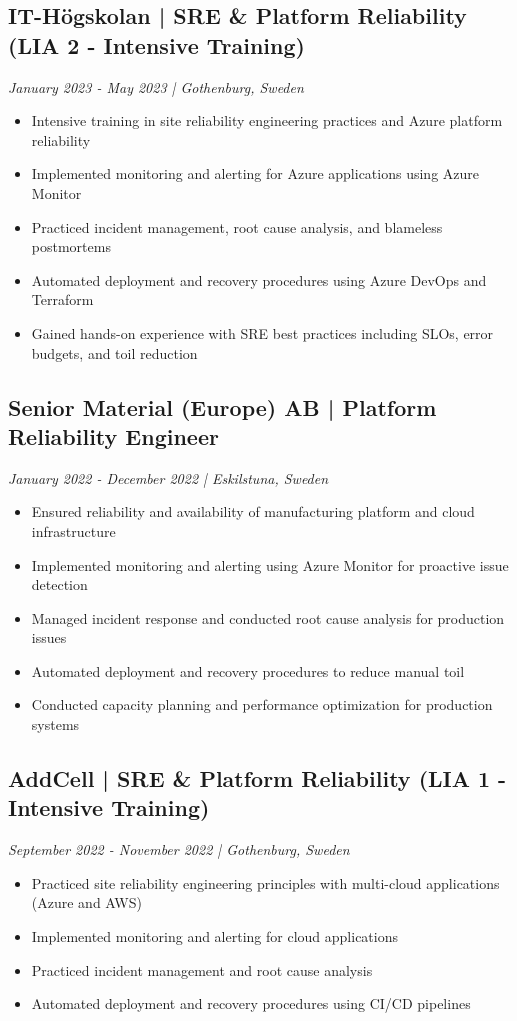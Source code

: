 \documentclass[11pt,a4paper]{article}
\begin{document}
\subsection*{IT-Högskolan | SRE \& Platform Reliability (LIA 2 - Intensive Training)}
\textit{January 2023 - May 2023 | Gothenburg, Sweden}
\begin{itemize}[noitemsep]
\item Intensive training in site reliability engineering practices and Azure platform reliability
\item Implemented monitoring and alerting for Azure applications using Azure Monitor
\item Practiced incident management, root cause analysis, and blameless postmortems
\item Automated deployment and recovery procedures using Azure DevOps and Terraform
\item Gained hands-on experience with SRE best practices including SLOs, error budgets, and toil reduction
\end{itemize}

\subsection*{Senior Material (Europe) AB | Platform Reliability Engineer}
\textit{January 2022 - December 2022 | Eskilstuna, Sweden}
\begin{itemize}[noitemsep]
\item Ensured reliability and availability of manufacturing platform and cloud infrastructure
\item Implemented monitoring and alerting using Azure Monitor for proactive issue detection
\item Managed incident response and conducted root cause analysis for production issues
\item Automated deployment and recovery procedures to reduce manual toil
\item Conducted capacity planning and performance optimization for production systems
\end{itemize}

\subsection*{AddCell | SRE \& Platform Reliability (LIA 1 - Intensive Training)}
\textit{September 2022 - November 2022 | Gothenburg, Sweden}
\begin{itemize}[noitemsep]
\item Practiced site reliability engineering principles with multi-cloud applications (Azure and AWS)
\item Implemented monitoring and alerting for cloud applications
\item Practiced incident management and root cause analysis
\item Automated deployment and recovery procedures using CI/CD pipelines
\end{itemize}
\end{document}
